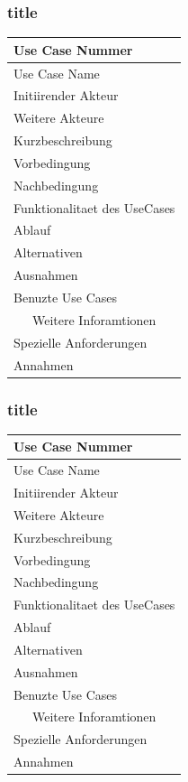 \documentclass[10pt,a4paper]{article}
\begin{document}
	\subsubsection{title}
		\begin{tabular}{|l|p{.5\linewidth}|}
		\hline Use Case Nummer &  \\ 
		\hline Use Case Name &  \\ 
		\hline Initiirender Akteur &  \\
		\hline Weitere Akteure &  \\
		\hline Kurzbeschreibung &  \\
		\hline Vorbedingung &  \\
		\hline Nachbedingung &  \\
		\hline \multicolumn{2}{|c|}{Funktionalitaet des UseCases}\\
		\hline Ablauf &  \\
		\hline Alternativen &  \\
		\hline Ausnahmen &  \\
		\hline Benuzte Use Cases &  \\
		\hline \multicolumn{2}{|c|}{Weitere Inforamtionen} \\
		\hline Spezielle Anforderungen &  \\
		\hline Annahmen &  \\
		\hline
		\end{tabular}
	\subsubsection{title}
		\begin{tabular}{|l|p{.5\linewidth}|}
		\hline Use Case Nummer &  \\ 
		\hline Use Case Name &  \\ 
		\hline Initiirender Akteur &  \\
		\hline Weitere Akteure &  \\
		\hline Kurzbeschreibung &  \\
		\hline Vorbedingung &  \\
		\hline Nachbedingung &  \\
		\hline \multicolumn{2}{|c|}{Funktionalitaet des UseCases}\\
		\hline Ablauf &  \\
		\hline Alternativen &  \\
		\hline Ausnahmen &  \\
		\hline Benuzte Use Cases &  \\
		\hline \multicolumn{2}{|c|}{Weitere Inforamtionen} \\
		\hline Spezielle Anforderungen &  \\
		\hline Annahmen &  \\
		\hline
		\end{tabular}
\end{document}
